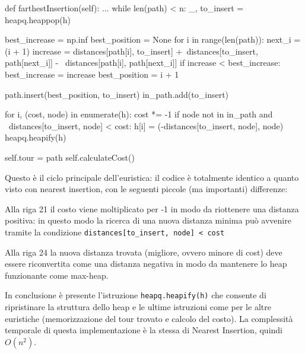 \documentclass[a4paper,12pt]{report}
\begin{document}
  \begin{python}
  def farthestInsertion(self):
    ...
    while len(path) < n:
      _, to_insert = heapq.heappop(h)
  
      best_increase = np.inf
      best_position = None
      for i in range(len(path)):
        next_i = (i + 1) %
        increase = distances[path[i], to_insert] +\
                   distances[to_insert, path[next_i]] - \
                   distances[path[i], path[next_i]]
        if increase < best_increase:
          best_increase = increase
          best_position = i + 1
  
      path.insert(best_position, to_insert)
      in_path.add(to_insert)
  
      for i, (cost, node) in enumerate(h):
        cost *= -1
        if node not in in_path and \
           distances[to_insert, node] < cost:
          h[i] = (-distances[to_insert, node], node)
      heapq.heapify(h)
  
    self.tour = path
    self.calculateCost()
  \end{python}
Questo è il ciclo principale dell'euristica: il codice è totalmente identico a quanto visto con nearest insertion, con le seguenti piccole (ma importanti) differenze:
\begin{legal}
  \item Alla riga 21 il costo viene moltiplicato per -1 in modo da riottenere una distanza positiva: in questo modo la ricerca di una nuova distanza minima può avvenire tramite la condizione \lstinline!distances[to_insert, node] < cost!
  \item Alla riga 24 la nuova distanza trovata (migliore, ovvero minore di cost) deve essere riconvertita come una distanza negativa in modo da mantenere lo heap funzionante come max-heap.
\end{legal}
In conclusione è presente l'istruzione \lstinline!heapq.heapify(h)! che consente di ripristinare la struttura dello heap e le ultime istruzioni come per le altre euristiche (memorizzazione del tour trovato e calcolo del costo). \newline
La complessità temporale di questa implementazione è la stessa di Nearest Insertion, quindi $O(n^2)$.
\end{document}
